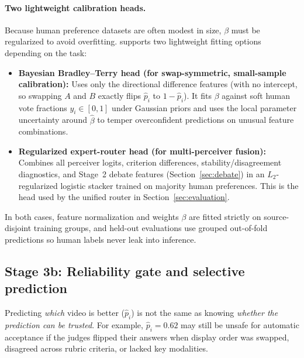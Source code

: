 \paragraph{Two lightweight calibration heads.}
Because human preference datasets are often modest in size, $\beta$ must be regularized to avoid overfitting. \critical supports two lightweight fitting options depending on the task:
\begin{itemize}[leftmargin=*, topsep=2pt, itemsep=2pt]
  \item \textbf{Bayesian Bradley--Terry head (for swap-symmetric, small-sample calibration):} Uses only the directional difference features (with no intercept, so swapping $A$ and $B$ exactly flips $\hat p_i$ to $1-\hat p_i$). It fits $\beta$ against soft human vote fractions $y_i\in[0,1]$ under Gaussian priors and uses the local parameter uncertainty around $\hat\beta$ to temper overconfident predictions on unusual feature combinations.
  \item \textbf{Regularized expert-router head (for multi-perceiver fusion):} Combines all perceiver logits, criterion differences, stability/disagreement diagnostics, and Stage~2 debate features (Section~\ref{sec:debate}) in an $L_2$-regularized logistic stacker trained on majority human preferences. This is the head used by the unified \critical router in Section~\ref{sec:evaluation}.
\end{itemize}
In both cases, feature normalization and weights $\beta$ are fitted strictly on source-disjoint training groups, and held-out evaluations use grouped out-of-fold predictions so human labels never leak into inference.

\subsection{Stage 3b: Reliability gate and selective prediction}
\label{sec:gate}
Predicting \emph{which} video is better ($\hat p_i$) is not the same as knowing \emph{whether the prediction can be trusted}. For example, $\hat p_i=0.62$ may still be unsafe for automatic acceptance if the judges flipped their answers when display order was swapped, disagreed across rubric criteria, or lacked key modalities.

